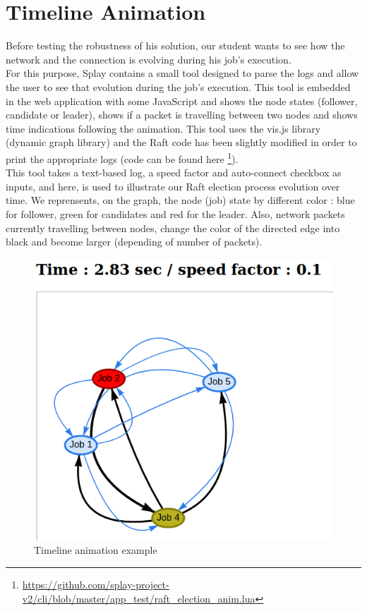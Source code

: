 \documentclass{eplmastersthesis}
\begin{document}
    \section{Timeline Animation}

      Before testing the robustness of his solution, our student wants to
      see how the network and the connection is evolving during his job's
      execution.\\
      For this purpose, Splay contains a small tool designed to parse the
      logs and allow the user to see that evolution during the job's
      execution. This tool is embedded in the web application with some
      JavaScript and shows the node states (follower, candidate or leader),
      shows if a packet is travelling between two nodes and shows time
      indications following the animation. This tool uses the vis.js library
      \cite{VisJS} (dynamic graph library) and the Raft code has been slightly
      modified in order to print the appropriate logs (code can be found here
      \footnote{\url{https://github.com/splay-project-v2/cli/blob/master/app_test/raft_election_anim.lua}}).\\

      This tool takes a text-based log, a speed factor and auto-connect
      checkbox as inputs, and here, is used to illustrate our Raft election
      process evolution over time. We reprensents, on the graph, the node (job) state
      by different color : blue for follower, green for candidates and red for the leader.
      Also, network packets currently travelling between nodes, change the color
      of the directed edge into black and become larger (depending of number of packets).

      \begin{figure}[H]
        \centering
        \includegraphics[width=0.7\linewidth]{figures/user_case/anim_pres.png}
        \caption{Timeline animation example}
      \end{figure}
\end{document}
